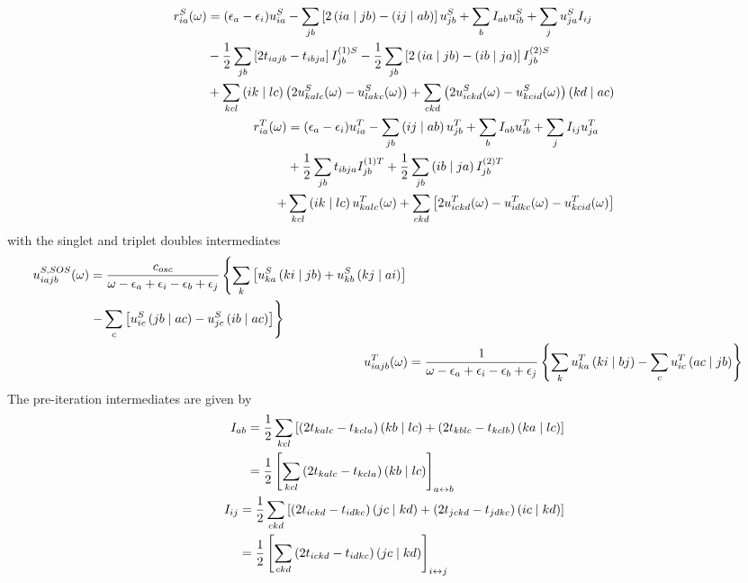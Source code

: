 \begin{align}
\begin{split}
r_{ia}^S(\omega) &= (\epsilon_a - \epsilon_i) u^S_{ia} - \sum_{jb} \left[ 2\left( ia \mid jb \right) - \left( ij \mid ab \right) \right] u_{jb}^S + \sum_b I_{ab} u^S_{ib} + \sum_j u_{ja}^S I_{ij} \\
&- \frac{1}{2} \sum_{jb} \left[2t_{iajb} - t_{ibja}\right] I^{(1)S}_{jb} - \frac{1}{2} \sum_{jb} \left[ 2 \left( ia \mid jb \right) - \left( ib \mid ja \right) \right] I^{(2)S}_{jb} \\
&+ \sum_{kcl} \left( ik \mid lc \right) \left( 2 u_{kalc}^S(\omega) - u_{lakc}^S(\omega) \right) + \sum_{ckd} \left( 2 u^S_{ickd}(\omega) - u^S_{kcid}(\omega) \right) \left( kd \mid ac \right)  
\end{split}
\label{eq:SPINADCS}
\\
\begin{split}
r_{ia}^T(\omega) &= (\epsilon_a - \epsilon_i) u_{ia}^T - \sum_{jb} \left( ij \mid ab \right) u_{jb}^T + \sum_b I_{ab} u_{ib}^T + \sum_j I_{ij} u_{ja}^T \\
&+ \frac{1}{2} \sum_{jb} t_{ibja} I^{(1)T}_{jb} + \frac{1}{2} \sum_{jb} \left( ib \mid ja \right) I^{(2)T}_{jb} \\
+& \sum_{kcl} \left( ik \mid lc \right) u^T_{kalc}(\omega) + \sum_{ckd} \left[ 2 u^T_{ickd}(\omega) - u^T_{idkc}(\omega) - u^T_{kcid}(\omega) \right] 
\end{split}
\label{eq:SPINADCT}
\end{align}
\noindent with the singlet and triplet doubles intermediates
\begin{align}
\begin{split}
u^{S,SOS}_{iajb}(\omega) &= \frac{c_{osc}}{\omega - \epsilon_a + \epsilon_i - \epsilon_b + \epsilon_j} \left\lbrace \sum_k \left[ u^S_{ka} \left( ki \mid jb \right) + u^S_{kb} \left( kj \mid ai \right) \right] \right. \\
&\left. - \sum_c \left[ u^S_{ic} \left( jb \mid ac \right) - u^S_{jc} \left( ib \mid ac \right) \right] \right\rbrace
\end{split} 
\\
u^T_{iajb}(\omega) &= \frac{1}{\omega - \epsilon_a + \epsilon_i - \epsilon_b + \epsilon_j} \left\lbrace \sum_k u^T_{ka} \left( ki \mid bj \right) - \sum_c u^T_{ic} \left( ac \mid jb \right) \right\rbrace
\end{align}
\noindent The pre-iteration intermediates are given by
\begin{align}
\begin{split}
I_{ab} &= \frac{1}{2} \sum_{kcl} \left[ \left( 2t_{kalc} - t_{kcla}\right) \left( kb \mid lc \right) + \left( 2t_{kblc} - t_{kclb} \right) \left( ka \mid lc \right) \right] \\
&= \frac{1}{2} \left[ \sum_{kcl} \left( 2t_{kalc} - t_{kcla}\right) \left( kb \mid lc \right) \right]_{a \leftrightarrow b}
\end{split}
\\
\begin{split}
I_{ij} &= \frac{1}{2} \sum_{ckd} \left[ \left( 2t_{ickd} - t_{idkc}\right) \left( jc \mid kd \right) + \left( 2t_{jckd} - t_{jdkc} \right) \left( ic \mid kd \right) \right] \\
&= \frac{1}{2} \left[ \sum_{ckd} \left( 2t_{ickd} - t_{idkc}\right) \left( jc \mid kd \right) \right]_{i \leftrightarrow j}
\end{split}
\end{align}
